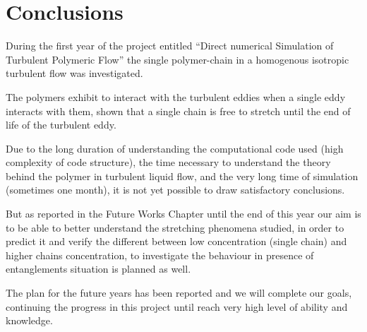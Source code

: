 \chapter{Conclusions}

During the first year of the project entitled ``Direct numerical Simulation of Turbulent Polymeric Flow'' 
the single polymer-chain in a homogenous isotropic turbulent flow was investigated. 

The polymers exhibit to interact with the turbulent eddies when a single eddy interacts with them, shown that a single chain is free to stretch until the end of life of the turbulent eddy. 

Due to the long duration of understanding the computational code used (high complexity of code structure),
the time necessary to understand the theory behind the polymer in turbulent liquid flow, and the very long time of simulation (sometimes one month), it is not yet possible to draw satisfactory conclusions. 

But as reported in the Future Works Chapter until the end of this year our aim is to be able to better understand the stretching phenomena studied, in order to predict it and verify the different between low concentration (single chain) and higher chains concentration, to investigate the behaviour in presence of entanglements situation is planned as well.

The plan for the future years has been reported and we will complete our goals, continuing the progress in 
this project until reach very high level of ability and knowledge. 



